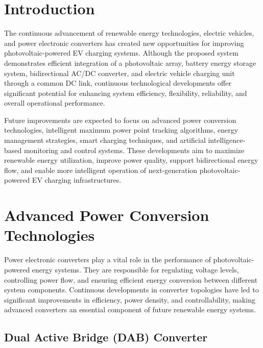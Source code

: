 \addtocounter{chapter}{0}
\setcounter{figure}{0}
\setcounter{table}{0}
\renewcommand{\thefigure}{7.\arabic{figure}} %
\renewcommand{\thetable}{7.\arabic{table}}   %
\section{Introduction}

The continuous advancement of renewable energy technologies, electric vehicles, and power electronic converters has created new opportunities for improving photovoltaic-powered EV charging systems. Although the proposed system demonstrates efficient integration of a photovoltaic array, battery energy storage system, bidirectional AC/DC converter, and electric vehicle charging unit through a common DC link, continuous technological developments offer significant potential for enhancing system efficiency, flexibility, reliability, and overall operational performance.

Future improvements are expected to focus on advanced power conversion technologies, intelligent maximum power point tracking algorithms, energy management strategies, smart charging techniques, and artificial intelligence-based monitoring and control systems. These developments aim to maximize renewable energy utilization, improve power quality, support bidirectional energy flow, and enable more intelligent operation of next-generation photovoltaic-powered EV charging infrastructures.
\section{Advanced Power Conversion Technologies}

Power electronic converters play a vital role in the performance of photovoltaic-powered energy systems. They are responsible for regulating voltage levels, controlling power flow, and ensuring efficient energy conversion between different system components. Continuous developments in converter topologies have led to significant improvements in efficiency, power density, and controllability, making advanced converters an essential component of future renewable energy systems.
\subsection{Dual Active Bridge (DAB) Converter}

